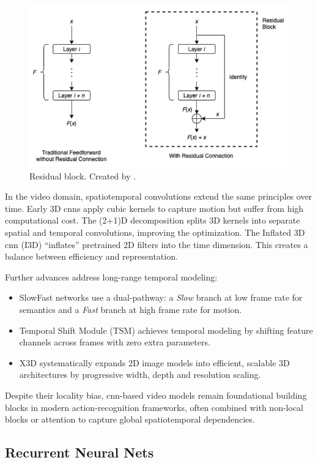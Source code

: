 \begin{figure}
    \centering
    \includegraphics[width=0.5\linewidth]{figures/res_connection.png} 
    \caption{Residual block. Created by \textcite{wong_what_is_residual_2022}. }
    \label{fig:res_connection}
\end{figure}

In the video domain, spatiotemporal convolutions extend the same principles over time. Early 3D \acrshort{cnn}s \cite{tran_learning_2015} apply cubic kernels to capture motion but suffer from high computational cost. The (2+1)D decomposition \cite{tran_2_plus_1_convolution} splits 3D kernels into separate spatial and temporal convolutions, improving the optimization. The Inflated 3D \acrshort{cnn} (I3D) \cite{carreira_2017_i3d_quo_vadis} “inflates” pretrained 2D filters into the time dimension. This creates a balance between efficiency and representation.

Further advances address long-range temporal modeling:
\begin{itemize}
    \item SlowFast networks \cite{feichtenhofer_slowfast_2019} use a dual-pathway: a \emph{Slow} branch at low frame rate for semantics and a \emph{Fast} branch at high frame rate for motion.  
    \item Temporal Shift Module (TSM) \cite{lin_temporal_shift_2019} achieves temporal modeling by shifting feature channels across frames with zero extra parameters.  
    \item X3D \cite{feichtenhofer_x3d_2020} systematically expands 2D image models into efficient, scalable 3D architectures by progressive width, depth and resolution scaling.
\end{itemize}

Despite their locality bias, \acrshort{cnn}-based video models remain foundational building blocks in modern action-recognition frameworks, often combined with non-local blocks or attention to capture global spatiotemporal dependencies.


\subsection{Recurrent Neural Nets}

